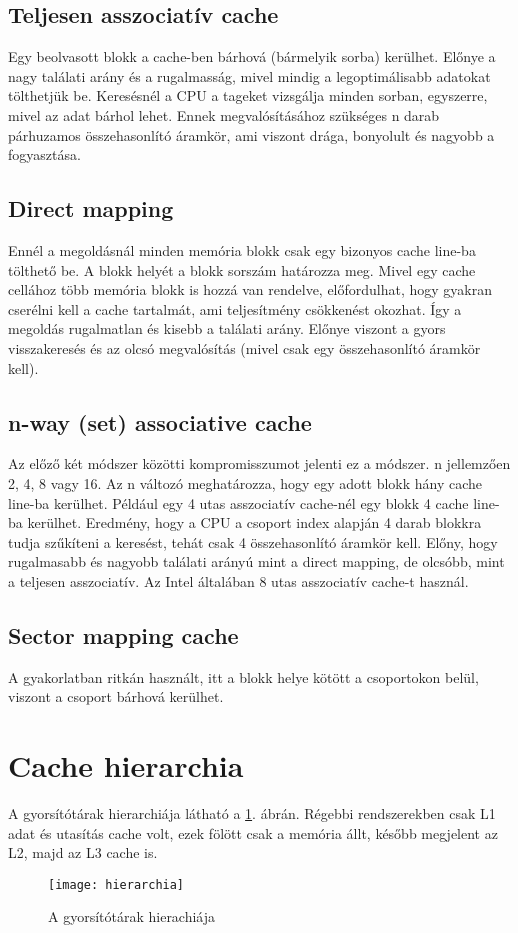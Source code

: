 \subsection{Teljesen asszociatív cache}
Egy beolvasott blokk a cache-ben bárhová (bármelyik sorba) kerülhet. Előnye a nagy találati arány és a rugalmasság, mivel mindig a legoptimálisabb adatokat tölthetjük be.
Keresésnél a CPU a tageket vizsgálja minden sorban, egyszerre, mivel az adat bárhol lehet.
Ennek megvalósításához szükséges n darab párhuzamos összehasonlító áramkör, ami viszont drága, bonyolult és nagyobb a fogyasztása.

\subsection{Direct mapping}
Ennél a megoldásnál minden memória blokk csak egy bizonyos cache line-ba tölthető be.
A blokk helyét a blokk sorszám határozza meg.
Mivel egy cache cellához több memória blokk is hozzá van rendelve, előfordulhat, hogy gyakran cserélni kell a cache tartalmát, ami teljesítmény csökkenést okozhat.
Így a megoldás rugalmatlan és kisebb a találati arány.
Előnye viszont a gyors visszakeresés és az olcsó megvalósítás (mivel csak egy összehasonlító áramkör kell).

\subsection{n-way (set) associative cache}
Az előző két módszer közötti kompromisszumot jelenti ez a módszer.
n jellemzően 2, 4, 8 vagy 16.
Az n változó meghatározza, hogy egy adott blokk hány cache line-ba kerülhet.
Például egy 4 utas asszociatív cache-nél egy blokk 4 cache line-ba kerülhet.
Eredmény, hogy a CPU a csoport index alapján 4 darab blokkra tudja szűkíteni a keresést, tehát csak 4 összehasonlító áramkör kell.
Előny, hogy rugalmasabb és nagyobb találati arányú mint a direct mapping, de olcsóbb, mint a teljesen asszociatív.
Az Intel általában 8 utas asszociatív cache-t használ.

\subsection{Sector mapping cache}
A gyakorlatban ritkán használt, itt a blokk helye kötött a csoportokon belül, viszont a csoport bárhová kerülhet.

\section{Cache hierarchia}
A gyorsítótárak hierarchiája látható a \ref{fig:hierarchia}. ábrán.
Régebbi rendszerekben csak L1 adat és utasítás cache volt, ezek fölött csak a memória állt, később megjelent az L2, majd az L3 cache is.
\begin{figure}[H]
    \texttt{[image: hierarchia]}
    \centering
    \caption{A gyorsítótárak hierachiája}
    \label{fig:hierarchia}
\end{figure}

